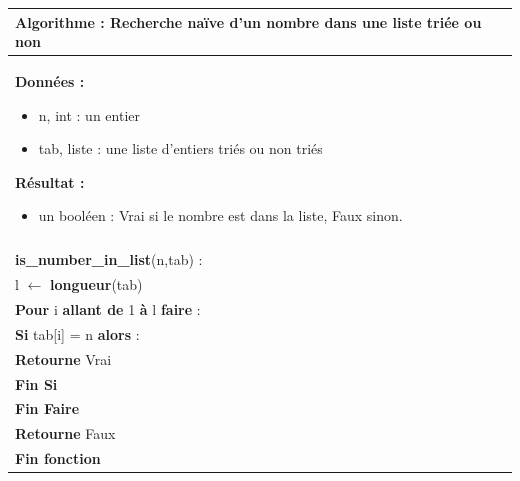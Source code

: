 \documentclass[10pt]{article}
\begin{document}
\begin{pseudo}
\begin{center}
\begin{tabular}{p{}}
\hline
\textbf{Algorithme :} Recherche naïve d'un nombre dans une liste triée ou non \\
\hline
\textbf{Données :}
\begin{itemize}
\item \textsf{n}, int : un entier 
\item \textsf{tab}, liste : une liste d'entiers triés ou non triés
\end{itemize}
\textbf{Résultat :} 
\begin{itemize}
\item un booléen : \textsf{Vrai} si le nombre est dans la liste, \textsf{Faux} sinon.
\end{itemize} \\
\\
\textbf{is\_number\_in\_list}(\textsf{n},\textsf{tab}) :\\
\hspace{.4cm}\textsf{l} $\leftarrow$ \textbf{longueur}(\textsf{tab}) \\
\hspace{.4cm}\textbf{Pour} \textsf{i} \textbf{allant de} 1 \textbf{à} \textsf{l} \textbf{faire} : \\
\hspace{.8cm} \textbf{Si}  \textsf{tab[i] = n} \textbf{alors} :\\
\hspace{1.2cm}\textbf{Retourne} \textsf{Vrai} \\
\hspace{.8cm} \textbf{Fin Si} \\
\hspace{.4cm}\textbf{Fin Faire} \\
\hspace{.4cm}\textbf{Retourne} \textsf{Faux} \\
\textbf{Fin fonction} \\
\hline
\end{tabular}
\end{center}
\end{pseudo}
\end{document}
